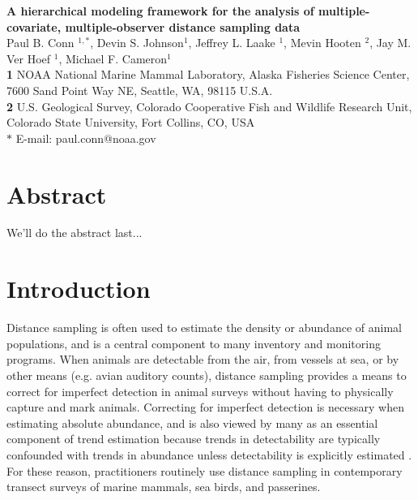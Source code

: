 \documentclass[10pt]{article}
\date{}
\begin{document}
\begin{flushleft}
{\Large
\textbf{A hierarchical modeling framework for the analysis of
multiple-covariate, multiple-observer distance sampling data} }
\\
Paul B. Conn $^{1,\ast}$,
Devin S. Johnson$^{1}$,
Jeffrey L. Laake $^{1}$,
Mevin Hooten $^{2}$,
Jay M. Ver Hoef $^{1}$,
Michael F. Cameron$^{1}$
\\
{\bf{1}} NOAA National Marine Mammal Laboratory, Alaska Fisheries Science Center,
7600 Sand Point Way NE, Seattle, WA, 98115 U.S.A.
\\
{\bf{2}} U.S. Geological Survey, Colorado Cooperative Fish and Wildlife Research Unit, Colorado
State University, Fort Collins, CO, USA
\\
$\ast$ E-mail: paul.conn@noaa.gov
\end{flushleft}

\section*{Abstract}
We'll do the abstract last...


\section*{Introduction}

Distance sampling \cite{BucklandEtAl2001} is often used to estimate the density or abundance of animal populations, and is a central component to many inventory and monitoring programs.  When animals are detectable from the air, from vessels at sea, or by other means (e.g. avian auditory counts), distance sampling provides a means to correct for imperfect detection in animal surveys without having to physically capture and mark animals.  Correcting for imperfect detection is necessary when estimating absolute abundance, and is also viewed by many as an essential component of trend estimation because trends in detectability are typically confounded with trends in abundance unless detectability is explicitly estimated \cite{Buckland2006,NicholsEtAl2009}.  For these reason, practitioners routinely use distance sampling in contemporary transect surveys of marine mammals, sea birds, and passerines.
\end{document}
